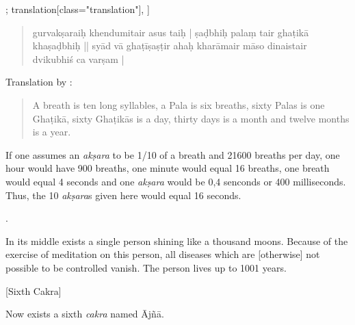 \begin{alignment}[
    texts=edition[class="edition"];
    translation[class="translation"],
]
\begin{translation}
\begin{tlate}
{{          \begin{quote}
            gurvakṣaraiḥ khendumitair asus taiḥ | ṣaḍbhiḥ palaṃ tair ghaṭikā khaṣaḍbhiḥ || syād vā ghaṭīṣaṣṭir ahaḥ kharāmair māso dinaistair dvikubhiś ca varṣam |
            \end{quote}
            Translation by \citeauthor[2013: p. 265, n. 46]{birch2013}: \begin{quote}
              A breath is ten long syllables, a Pala is six breaths, sixty Palas is one Ghaṭikā, sixty Ghaṭikās is a day, thirty days is a month and twelve months is a year.
            \end{quote}
            If one assumes an \textit{akṣara} to be 1/10 of a breath and 21600 breaths per day, one hour would have 900 breaths, one minute would equal 16 breaths, one breath would equal 4 seconds and one \textit{akṣara} would be 0,4 senconds or 400 milliseconds. Thus, the 10 \textit{akṣara}s given here would equal 16 seconds.}.} In its middle exists a single person shining like a thousand moons. Because of the exercise of meditation on this person, all diseases which are [otherwise] not possible to be controlled vanish. The person lives up to 1001 years.\end{tlate}
    \begin{tlate}
    \bigskip
    \centerline{\textrm{\small{[Sixth Cakra]}}}
    \bigskip
     Now exists a sixth \textit{cakra} named Ājñā. \vspace*{\fill} 
    \end{tlate}
  \end{translation}
\end{alignment}
\ekdpb*{}
